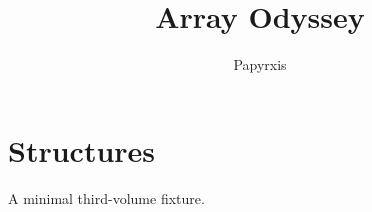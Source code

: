 \documentclass[11pt,oneside]{book}
\title{Array Odyssey}
\author{Papyrxis}
\begin{document}
\maketitle
\chapter{Structures}
A minimal third-volume fixture.
\end{document}
